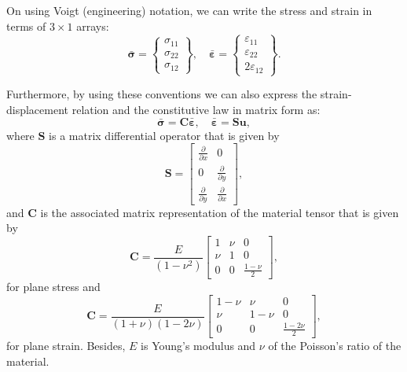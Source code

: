 \documentclass[kulak]{kulakarticle} %
\begin{document}
On using Voigt (engineering) notation, we can write the stress and strain in terms of $3\times 1$ arrays:
\begin{equation}
    \bar{\bm{\sigma}} = \begin{Bmatrix}
        \sigma_{11} \\ \sigma_{22} \\ \sigma_{12}
    \end{Bmatrix},\quad 
    \bar{\bm{\varepsilon}} = \begin{Bmatrix}
        \varepsilon_{11}\\ \varepsilon_{22} \\ 2\varepsilon_{12}
    \end{Bmatrix}.
\end{equation}

Furthermore, by using these conventions we can also express the strain-
displacement relation and the constitutive law in matrix form as:
\begin{equation}
    \bar{\bm{\sigma}} = \bm{C}\bar{\bm{\varepsilon}},\quad 
    \bar{\bm{\varepsilon}} = \bm{S}\bm{u},
\end{equation}
where $\bm{S}$ is a matrix differential operator that is given by
\begin{equation}
    \bm{S} = \begin{bmatrix}
        \frac{\partial}{\partial x} & 0 \\
        0 & \frac{\partial}{\partial y} \\
        \frac{\partial}{\partial y} & \frac{\partial}{\partial x}
    \end{bmatrix},
\end{equation}
and $\bm{C}$ is the associated matrix representation of the material tensor that
is given by 
\begin{equation}
    \bm{C} = \frac{E}{(1-\nu^2)}\begin{bmatrix}
        1 & \nu & 0\\
        \nu & 1 & 0\\
        0 & 0 & \frac{1-\nu}{2}
    \end{bmatrix},
\end{equation}
for plane stress and 
\begin{equation}
    \bm{C} = \frac{E}{(1+\nu)(1-2\nu)}\begin{bmatrix}
        1-\nu & \nu & 0\\
        \nu & 1-\nu & 0\\
        0 & 0 & \frac{1-2\nu}{2}
    \end{bmatrix},
\end{equation}
for plane strain.
Besides, $E$ is Young's modulus and $\nu$ of the Poisson's ratio of the material.
\end{document}
